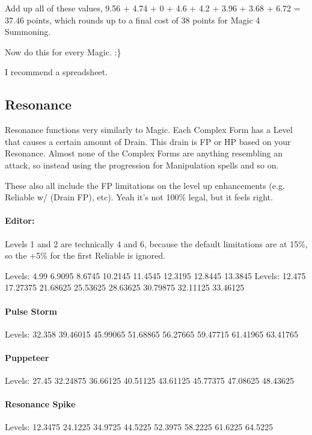 \begin{multicols*}{2}
	Add up all of these values, 9.56 + 4.74 + 0 + 4.6 + 4.2 + 3.96 + 3.68 + 6.72 = 37.46 points, which rounds up to a final cost of 38 points for Magic 4 Summoning.
	
	Now do this for every Magic. :\}
	
	I recommend a spreadsheet.
	
	\subsection{Resonance}
	
	Resonance functions very similarly to Magic. Each Complex Form has a Level that causes a certain amount of Drain. This drain is FP or HP based on your Resonance. Almost none of the Complex Forms are anything resembling an attack, so instead using the progression for Manipulation spells and so on.
	
	These also all include the FP limitations on the level up enhancements (e.g. Reliable w/ (Drain FP), etc). Yeah it's not 100\% legal, but it feels right.
	
	\paragraph{Editor:} 
	Levels 1 and 2 are technically 4 and 6, because the default limitations are at 15\%, so the +5\% for the first Reliable is ignored.	
	
	Levels: 4.99 6.9095 8.6745 10.2145 11.4545 12.3195 12.8445 13.3845
	Levels: 12.475 17.27375 21.68625 25.53625 28.63625 30.79875 32.11125 33.46125
	
	\paragraph{Pulse Storm}
	
	Levels: 32.358 39.46015 45.99065 51.68865 56.27665 59.47715 61.41965 63.41765
	
	\paragraph{Puppeteer}
	Levels: 27.45 32.24875 36.66125 40.51125 43.61125 45.77375 47.08625 48.43625
	
	\paragraph{Resonance Spike}
	
	Levels: 12.3475 24.1225 34.9725 44.5225 52.3975 58.2225 61.6225 64.5225
	

\end{multicols*}
